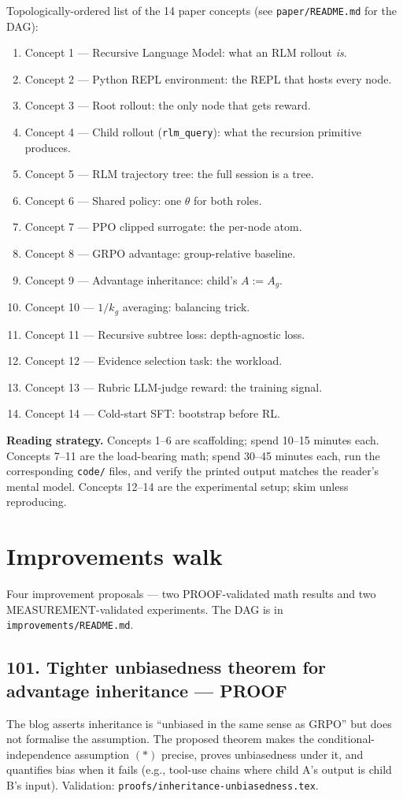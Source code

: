 \documentclass[11pt]{article}
\begin{document}
Topologically-ordered list of the 14 paper concepts (see
\texttt{paper/README.md} for the DAG):
\begin{enumerate}
\item Concept 1 --- Recursive Language Model: what an RLM rollout \emph{is}.
\item Concept 2 --- Python REPL environment: the REPL that hosts every node.
\item Concept 3 --- Root rollout: the only node that gets reward.
\item Concept 4 --- Child rollout (\texttt{rlm\_query}): what the recursion
      primitive produces.
\item Concept 5 --- RLM trajectory tree: the full session is a tree.
\item Concept 6 --- Shared policy: one $\theta$ for both roles.
\item Concept 7 --- PPO clipped surrogate: the per-node atom.
\item Concept 8 --- GRPO advantage: group-relative baseline.
\item Concept 9 --- Advantage inheritance: child's $A := A_g$.
\item Concept 10 --- $1/k_g$ averaging: balancing trick.
\item Concept 11 --- Recursive subtree loss: depth-agnostic loss.
\item Concept 12 --- Evidence selection task: the workload.
\item Concept 13 --- Rubric LLM-judge reward: the training signal.
\item Concept 14 --- Cold-start SFT: bootstrap before RL.
\end{enumerate}

\textbf{Reading strategy.} Concepts 1--6 are scaffolding; spend 10--15 minutes
each. Concepts 7--11 are the load-bearing math; spend 30--45 minutes each, run
the corresponding \texttt{code/} files, and verify the printed output matches
the reader's mental model. Concepts 12--14 are the experimental setup; skim
unless reproducing.

\section{Improvements walk}

Four improvement proposals --- two PROOF-validated math results and two
MEASUREMENT-validated experiments. The DAG is in \texttt{improvements/README.md}.

\subsection*{101. Tighter unbiasedness theorem for advantage inheritance --- PROOF}
The blog asserts inheritance is ``unbiased in the same sense as GRPO'' but
does not formalise the assumption. The proposed theorem makes the
conditional-independence assumption $(*)$ precise, proves unbiasedness under
it, and quantifies bias when it fails (e.g., tool-use chains where child A's
output is child B's input). Validation: \texttt{proofs/inheritance-unbiasedness.tex}.
\end{document}
